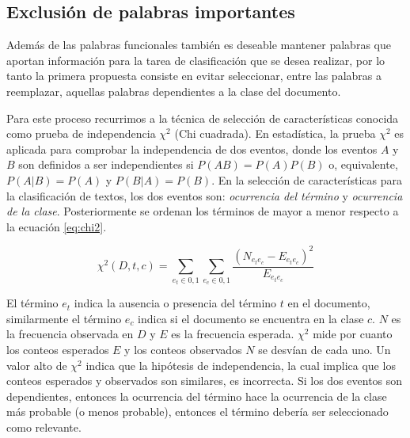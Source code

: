 

\subsection{Exclusión de palabras importantes}


Además de las palabras funcionales también es deseable mantener palabras que aportan información para la tarea de clasificación que se desea realizar, por lo tanto la primera propuesta consiste en evitar seleccionar, entre las palabras a reemplazar, aquellas  palabras dependientes a la clase del documento. 

Para este proceso recurrimos a la técnica de selección de características conocida como prueba de independencia $\chi^2$ (Chi cuadrada). En estadística, la prueba $\chi^2$ es aplicada para comprobar la independencia de dos eventos, donde los eventos $A$ y $B$ son definidos a ser independientes si  $P(AB)= P(A)P(B)$ o, equivalente, $P(A|B)=P(A)$ y $P(B|A)=P(B)$. En la selección de características para la clasificación de textos, los dos eventos son: \textit{ocurrencia del término} y \textit{ocurrencia de la clase}. Posteriormente se ordenan los términos de mayor a menor respecto a la ecuación \ref{eq:chi2}.

\begin{equation}
    \label{eq:chi2}
    \chi^2(D, t, c)= \sum_{e_t \in {0,1} }^{} \sum_{e_c \in {0,1} }^{} \frac{(N_{e_t e_c} - E _{e_t e_c})^2}{E_{e_t e_c}}
\end{equation}

El término $e_t$ indica la ausencia o presencia del término $t$ en el documento, similarmente el término $e_c$ indica si el documento se encuentra en la clase $c$. $N$ es la frecuencia observada en $D$ y $E$ es la frecuencia esperada. $\chi^2$ mide por cuanto los conteos esperados $E$ y los conteos observados $N$ se desvían de cada uno. Un valor alto de $\chi^2$ indica que la hipótesis de independencia, la cual implica que los conteos esperados y observados son similares, es incorrecta. Si los dos eventos son dependientes, entonces la ocurrencia del término hace la ocurrencia de la clase más probable (o menos probable), entonces el término debería ser seleccionado como relevante.

